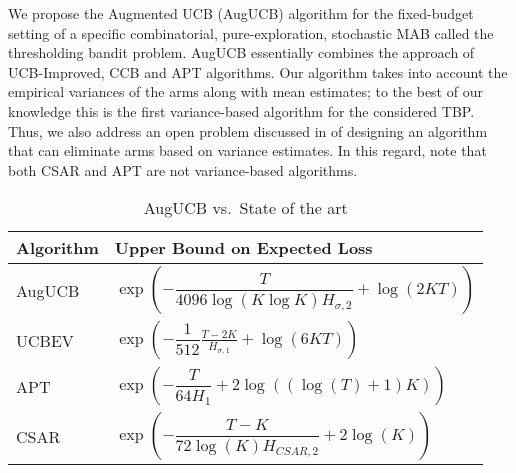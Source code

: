We propose the Augmented UCB (AugUCB) algorithm for the fixed-budget setting of a specific combinatorial, pure-exploration, stochastic MAB called the thresholding bandit problem.
 AugUCB essentially combines the approach of UCB-Improved, CCB \citep{liu2016modification} and APT algorithms. Our algorithm takes into account the empirical variances of the arms along with mean estimates; to the best of our knowledge this is the first variance-based algorithm for the considered TBP. 
Thus, we also address an open problem discussed in \cite{auer2010ucb} of designing an algorithm that can eliminate arms based on variance estimates. In this regard, note that both CSAR and APT are not variance-based algorithms. 

\begin{table}[b]
\caption{AugUCB vs.\ State of the art}
\label{tab:regret-bds}
\begin{center}
\begin{tabular}{|p{2.3cm}|p{8.4cm}|}
\hline
Algorithm  & Upper Bound on Expected Loss \\
\hline
\hline
AugUCB      &$ \exp\left(- \dfrac{T}{4096 \log(K\log K)H_{\sigma,2}} + \log\left(2KT\right) \right) $ \\
\hline
\hline
UCBEV		&$\exp\left(-\dfrac{1}{512}\frac{T-2K}{H_{\sigma,1}} + \log\left(6KT\right)\right)$ \\
\hline
\hline
APT         &$\exp\left(-\dfrac{T}{64 H_1}+2\log((\log(T)+1)K)\right)$ \\
\hline
\hline
CSAR		&$\exp\left(-\dfrac{T-K}{72\log(K)H_{CSAR,2}}+2\log(K)\right)$ \\
\hline

\end{tabular}
\end{center}
\end{table}

